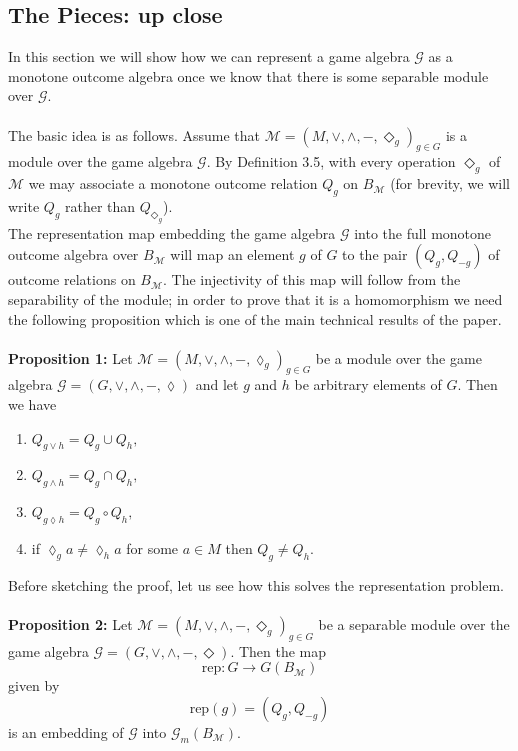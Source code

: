 \documentclass[12pt]{article}
\begin{document}
\subsection{The Pieces: up close}
In this section we will show how we can represent a game algebra $\mathcal{G}$ as a monotone outcome algebra once we know that there is some separable module over $\mathcal{G}$. \\ \\
The basic idea is as follows. Assume that 
$\mathcal{M} = (M, \vee, \wedge, -, \Diamond_{g})_{g \in G}$
is a module over the game algebra $\mathcal{G}$. By Definition 3.5, with every operation $\Diamond_{g}$ of $\mathcal{M}$ we may associate a monotone outcome relation $Q_{g}$ on $B_{\mathcal{M}}$ (for brevity, we will write $Q_{g}$ rather than $Q_{\Diamond_{g}}$). \\
The representation map embedding the game algebra $\mathcal{G}$ into the full monotone outcome algebra over $B_{\mathcal{M}}$ will map an element $g$ of $G$ to the pair $(Q_{g}, Q_{-g})$ of outcome relations on $B_{\mathcal{M}}$. The injectivity of this map will follow from the separability of the module; in order to prove that it is a homomorphism we need the following proposition which is one of the main technical results of the paper.\\ \\
\textbf{Proposition 1:} Let $\mathcal{M} = (M, \vee, \wedge, -, \lozenge_{g})_{g \in G}$ be a module over the game algebra $\mathcal{G} = (G, \vee, \wedge, -, \lozenge)$
and let $g$ and $h$ be arbitrary elements of $G$. Then we have
\begin{enumerate}
  \item $Q_{g \vee h} = Q_{g} \cup Q_{h},$
  \item $Q_{g \wedge h} = Q_{g} \cap Q_{h},$
  \item $Q_{g \lozenge h} = Q_{g} \circ Q_{h},$
  \item if $\lozenge_{g} a \neq \lozenge_{h} a$ for some $a \in M$ then $Q_{g} \neq Q_{h}.$
\end{enumerate}
Before sketching the proof, let us see how this solves the representation problem. \\ \\
\textbf{Proposition 2:} 
Let $\mathcal{M} = (M, \vee, \wedge, -, \Diamond_g)_{g \in G}$ be a separable module over the game algebra 
$\mathcal{G} = (G, \vee, \wedge, -, \Diamond)$. Then the map 
\[
\mathrm{rep} : G \to G(B_{\mathcal{M}})
\]
given by
\[
\mathrm{rep}(g) = (Q_g, Q_{-g})
\]
is an embedding of $\mathcal{G}$ into $\mathcal{G}_m(B_{\mathcal{M}})$. \\ \\
\end{document}
